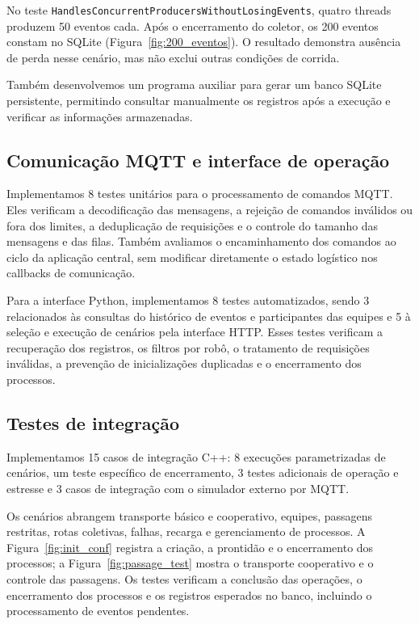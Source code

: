 \documentclass[12pt,a4paper]{article}
\newcommand{\code}[1]{\mbox{\texttt{#1}}}
\begin{document}
No teste \code{HandlesConcurrentProducersWithoutLosingEvents}, quatro threads
produzem 50 eventos cada. Após o encerramento do coletor, os 200 eventos
constam no SQLite (Figura~\ref{fig:200_eventos}). O resultado demonstra
ausência de perda nesse cenário, mas não exclui outras condições de corrida.

Também desenvolvemos um programa auxiliar para gerar um banco SQLite
persistente, permitindo consultar manualmente os registros após a execução e
verificar as informações armazenadas.

\subsection{Comunicação MQTT e interface de operação}

Implementamos 8 testes unitários para o processamento de comandos MQTT. Eles
verificam a decodificação das mensagens, a rejeição de comandos inválidos ou
fora dos limites, a deduplicação de requisições e o controle do tamanho das
mensagens e das filas. Também avaliamos o encaminhamento dos comandos ao ciclo
da aplicação central, sem modificar diretamente o estado logístico nos
callbacks de comunicação.

Para a interface Python, implementamos 8 testes automatizados, sendo 3
relacionados às consultas do histórico de eventos e participantes das equipes e
5 à seleção e execução de cenários pela interface HTTP. Esses testes verificam
a recuperação dos registros, os filtros por robô, o tratamento de requisições
inválidas, a prevenção de inicializações duplicadas e o encerramento dos
processos.

\subsection{Testes de integração}

Implementamos 15 casos de integração C++: 8 execuções parametrizadas de
cenários, um teste específico de encerramento, 3 testes adicionais de operação
e estresse e 3 casos de integração com o simulador externo por MQTT.

Os cenários abrangem transporte básico e cooperativo, equipes, passagens
restritas, rotas coletivas, falhas, recarga e gerenciamento de processos. A
Figura~\ref{fig:init_conf} registra a criação, a prontidão e o encerramento dos
processos; a Figura~\ref{fig:passage_test} mostra o transporte cooperativo e o
controle das passagens. Os testes verificam a conclusão das operações, o
encerramento dos processos e os registros esperados no banco, incluindo o
processamento de eventos pendentes.
\end{document}
